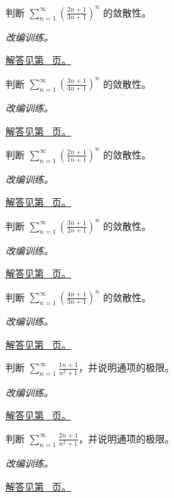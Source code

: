 \documentclass[UTF8,12pt,a4paper,fontset=fandol]{ctexart}
\begin{document}
\begin{example}[根值判别的直接使用]\label{ex:c25q8}
判断 $\displaystyle\sum_{n=1}^\infty\left(\frac{2n+1}{3n+1}\right)^n$ 的敛散性。
\par\textit{改编训练。}\par\hyperref[ans:c25q8]{解答见第~\pageref{ans:c25q8} 页。}
\end{example}
\begin{example}[根值判别的直接使用]\label{ex:c25q9}
判断 $\displaystyle\sum_{n=1}^\infty\left(\frac{3n+1}{4n+1}\right)^n$ 的敛散性。
\par\textit{改编训练。}\par\hyperref[ans:c25q9]{解答见第~\pageref{ans:c25q9} 页。}
\end{example}
\begin{example}[根值判别的直接使用]\label{ex:c25q10}
判断 $\displaystyle\sum_{n=1}^\infty\left(\frac{2n+1}{1n+1}\right)^n$ 的敛散性。
\par\textit{改编训练。}\par\hyperref[ans:c25q10]{解答见第~\pageref{ans:c25q10} 页。}
\end{example}
\begin{example}[根值判别的直接使用]\label{ex:c25q11}
判断 $\displaystyle\sum_{n=1}^\infty\left(\frac{3n+1}{2n+1}\right)^n$ 的敛散性。
\par\textit{改编训练。}\par\hyperref[ans:c25q11]{解答见第~\pageref{ans:c25q11} 页。}
\end{example}
\begin{example}[根值判别的直接使用]\label{ex:c25q12}
判断 $\displaystyle\sum_{n=1}^\infty\left(\frac{4n+1}{3n+1}\right)^n$ 的敛散性。
\par\textit{改编训练。}\par\hyperref[ans:c25q12]{解答见第~\pageref{ans:c25q12} 页。}
\end{example}
\begin{example}[通项趋零与调和型发散]\label{ex:c25q13}
判断 $\displaystyle\sum_{n=1}^\infty\frac{1n+1}{n^2+1}$，并说明通项的极限。
\par\textit{改编训练。}\par\hyperref[ans:c25q13]{解答见第~\pageref{ans:c25q13} 页。}
\end{example}
\begin{example}[通项趋零与调和型发散]\label{ex:c25q14}
判断 $\displaystyle\sum_{n=1}^\infty\frac{2n+1}{n^2+1}$，并说明通项的极限。
\par\textit{改编训练。}\par\hyperref[ans:c25q14]{解答见第~\pageref{ans:c25q14} 页。}
\end{example}
\end{document}
